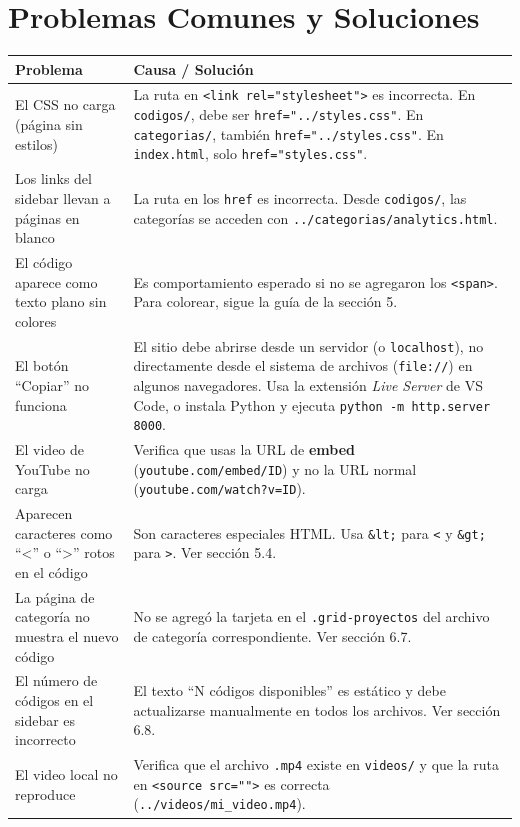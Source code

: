 \documentclass[12pt, a4paper]{article}
\newcommand{\archivo}[1]{\texttt{\textcolor{cpAccent}{#1}}}
\newcommand{\clase}[1]{\texttt{\textcolor{cpAzul}{.#1}}}
\begin{document}
\section{Problemas Comunes y Soluciones}

\begin{longtable}{p{5.5cm}p{8.5cm}}
\toprule
\textbf{Problema} & \textbf{Causa / Solución} \\
\midrule
\endhead

El CSS no carga (página sin estilos)
&
La ruta en \texttt{<link rel="stylesheet">} es incorrecta.
En \archivo{codigos/}, debe ser \texttt{href="../styles.css"}.
En \archivo{categorias/}, también \texttt{href="../styles.css"}.
En \archivo{index.html}, solo \texttt{href="styles.css"}.
\\[8pt]

Los links del sidebar llevan a páginas en blanco
&
La ruta en los \texttt{href} es incorrecta. Desde \archivo{codigos/},
las categorías se acceden con \texttt{../categorias/analytics.html}.
\\[8pt]

El código aparece como texto plano sin colores
&
Es comportamiento esperado si no se agregaron los \texttt{<span>}.
Para colorear, sigue la guía de la sección 5.
\\[8pt]

El botón ``Copiar'' no funciona
&
El sitio debe abrirse desde un servidor (o \texttt{localhost}), no
directamente desde el sistema de archivos (\texttt{file://}) en algunos navegadores.
Usa la extensión \textit{Live Server} de VS Code, o instala Python y ejecuta
\texttt{python -m http.server 8000}.
\\[8pt]

El video de YouTube no carga
&
Verifica que usas la URL de \textbf{embed} (\texttt{youtube.com/embed/ID})
y no la URL normal (\texttt{youtube.com/watch?v=ID}).
\\[8pt]

Aparecen caracteres como ``<'' o ``>'' rotos en el código
&
Son caracteres especiales HTML. Usa \texttt{\&lt;} para \texttt{<}
y \texttt{\&gt;} para \texttt{>}. Ver sección 5.4.
\\[8pt]

La página de categoría no muestra el nuevo código
&
No se agregó la tarjeta en el \clase{grid-proyectos} del archivo
de categoría correspondiente. Ver sección 6.7.
\\[8pt]

El número de códigos en el sidebar es incorrecto
&
El texto ``N códigos disponibles'' es estático y debe actualizarse
manualmente en todos los archivos. Ver sección 6.8.
\\[8pt]

El video local no reproduce
&
Verifica que el archivo \texttt{.mp4} existe en \archivo{videos/}
y que la ruta en \texttt{<source src="">} es correcta (\texttt{../videos/mi\_video.mp4}).
\\

\bottomrule
\end{longtable}
\end{document}
